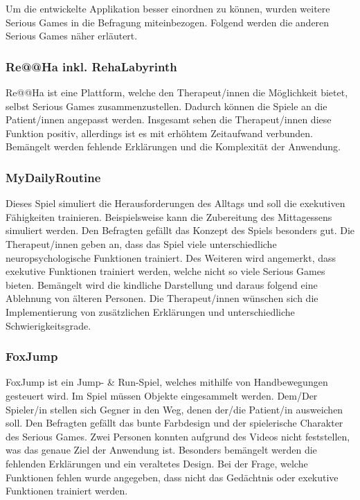 Um die entwickelte Applikation besser einordnen zu können, wurden weitere Serious Games in die Befragung miteinbezogen. Folgend werden die anderen Serious Games näher erläutert.

\subsubsection{Re@@Ha inkl. RehaLabyrinth}
Re@@Ha ist eine Plattform, welche den Therapeut/innen die Möglichkeit bietet, selbst Serious Games zusammenzustellen. Dadurch können die Spiele an die Patient/innen angepasst werden. Insgesamt sehen die Therapeut/innen diese Funktion positiv, allerdings ist es mit erhöhtem Zeitaufwand verbunden. Bemängelt werden fehlende Erklärungen und die Komplexität der Anwendung.

\subsubsection{MyDailyRoutine}
Dieses Spiel simuliert die Herausforderungen des Alltags und soll die exekutiven Fähigkeiten trainieren. Beispielsweise kann die Zubereitung des Mittagessens simuliert werden. Den Befragten gefällt das Konzept des Spiels besonders gut. Die Therapeut/innen geben an, dass das Spiel viele unterschiedliche neuropsychologische Funktionen trainiert. Des Weiteren wird angemerkt, dass exekutive Funktionen trainiert werden, welche nicht so viele Serious Games bieten. Bemängelt wird die kindliche Darstellung und daraus folgend eine Ablehnung von älteren Personen. Die Therapeut/innen wünschen sich die Implementierung von zusätzlichen Erklärungen und unterschiedliche Schwierigkeitsgrade.

\subsubsection{FoxJump} 
FoxJump ist ein Jump- \& Run-Spiel, welches mithilfe von Handbewegungen gesteuert wird. Im Spiel müssen Objekte eingesammelt werden. Dem/Der Spieler/in stellen sich Gegner in den Weg, denen der/die Patient/in ausweichen soll. Den Befragten gefällt das bunte Farbdesign und der spielerische Charakter des Serious Games. Zwei Personen konnten aufgrund des Videos nicht feststellen, was das genaue Ziel der Anwendung ist. Besonders bemängelt werden die fehlenden Erklärungen und ein veraltetes Design. Bei der Frage, welche Funktionen fehlen wurde angegeben, dass nicht das Gedächtnis oder exekutive Funktionen trainiert werden.

